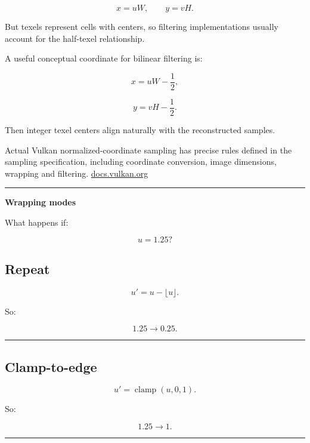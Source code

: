 \[
x=uW,
\qquad
y=vH.
\]

But texels represent cells with centers, so filtering implementations usually account for the half-texel relationship.

A useful conceptual coordinate for bilinear filtering is:

\[
x=uW-\frac12,
\]

\[
y=vH-\frac12.
\]

Then integer texel centers align naturally with the reconstructed samples.

Actual Vulkan normalized-coordinate sampling has precise rules defined in the sampling specification, including coordinate conversion, image dimensions, wrapping and filtering. \href{https://docs.vulkan.org/spec/latest/chapters/textures.html?utm_source=chatgpt.com}{docs.vulkan.org}

\begin{center}\rule{0.5\linewidth}{0.5pt}\end{center}

\textbf{Wrapping modes}

What happens if:

\[
u=1.25?
\]

\subsection{Repeat}\label{03-visual-computing-i-ch019-repeat}

\hypertarget{03-visual-computing-i-ch019-repeat}{}

\[
u'=u-\lfloor u\rfloor.
\]

So:

\[
1.25\rightarrow0.25.
\]

\begin{center}\rule{0.5\linewidth}{0.5pt}\end{center}

\subsection{Clamp-to-edge}\label{03-visual-computing-i-ch019-clamp-to-edge}

\hypertarget{03-visual-computing-i-ch019-clamp-to-edge}{}

\[
u'=
\operatorname{clamp}(u,0,1).
\]

So:

\[
1.25\rightarrow1.
\]

\begin{center}\rule{0.5\linewidth}{0.5pt}\end{center}

